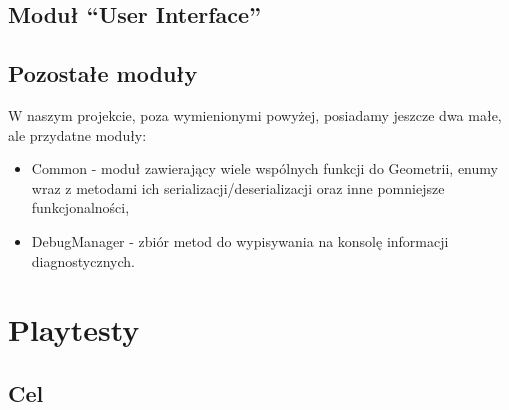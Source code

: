 \documentclass[licencjacka]{pracamgr}
\begin{document}
  \section{Moduł ``User Interface''}




  \section{Pozostałe moduły}
    W naszym projekcie, poza wymienionymi powyżej, posiadamy jeszcze dwa małe, ale przydatne moduły:
    \begin{itemize}
     \item Common - moduł zawierający wiele wspólnych funkcji do Geometrii, enumy wraz z metodami ich
     serializacji/deserializacji oraz inne pomniejsze funkcjonalności,
     \item DebugManager - zbiór metod do wypisywania na konsolę informacji diagnostycznych.
    \end{itemize}


\chapter{Playtesty}
  \section{Cel}
\end{document}
